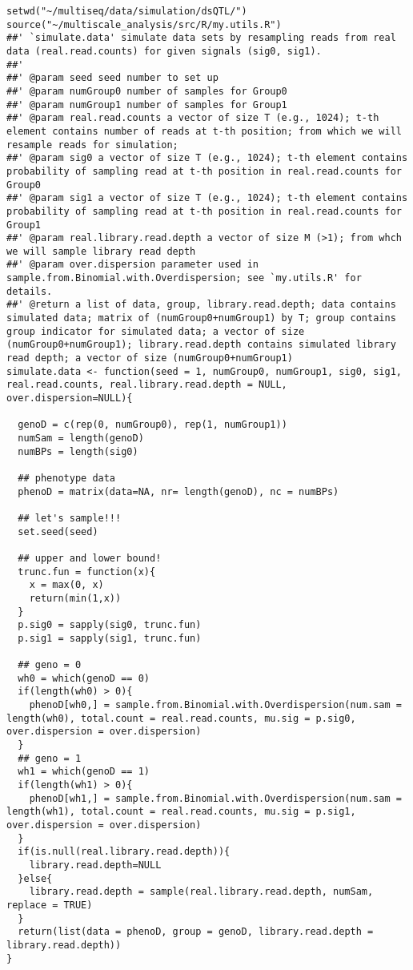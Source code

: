 \documentclass[11pt]{article}
\begin{document}
\begin{lstlisting}
setwd("~/multiseq/data/simulation/dsQTL/")
source("~/multiscale_analysis/src/R/my.utils.R")
##' `simulate.data' simulate data sets by resampling reads from real data (real.read.counts) for given signals (sig0, sig1).
##' 
##' @param seed seed number to set up
##' @param numGroup0 number of samples for Group0
##' @param numGroup1 number of samples for Group1
##' @param real.read.counts a vector of size T (e.g., 1024); t-th element contains number of reads at t-th position; from which we will resample reads for simulation;
##' @param sig0 a vector of size T (e.g., 1024); t-th element contains probability of sampling read at t-th position in real.read.counts for Group0
##' @param sig1 a vector of size T (e.g., 1024); t-th element contains probability of sampling read at t-th position in real.read.counts for Group1
##' @param real.library.read.depth a vector of size M (>1); from whch we will sample library read depth
##' @param over.dispersion parameter used in sample.from.Binomial.with.Overdispersion; see `my.utils.R' for details. 
##' @return a list of data, group, library.read.depth; data contains simulated data; matrix of (numGroup0+numGroup1) by T; group contains group indicator for simulated data; a vector of size (numGroup0+numGroup1); library.read.depth contains simulated library read depth; a vector of size (numGroup0+numGroup1)
simulate.data <- function(seed = 1, numGroup0, numGroup1, sig0, sig1, real.read.counts, real.library.read.depth = NULL, over.dispersion=NULL){

  genoD = c(rep(0, numGroup0), rep(1, numGroup1))
  numSam = length(genoD)
  numBPs = length(sig0)

  ## phenotype data
  phenoD = matrix(data=NA, nr= length(genoD), nc = numBPs)

  ## let's sample!!!
  set.seed(seed)

  ## upper and lower bound!
  trunc.fun = function(x){
    x = max(0, x)
    return(min(1,x))
  }
  p.sig0 = sapply(sig0, trunc.fun)
  p.sig1 = sapply(sig1, trunc.fun)

  ## geno = 0
  wh0 = which(genoD == 0)
  if(length(wh0) > 0){
    phenoD[wh0,] = sample.from.Binomial.with.Overdispersion(num.sam = length(wh0), total.count = real.read.counts, mu.sig = p.sig0, over.dispersion = over.dispersion)
  }  
  ## geno = 1
  wh1 = which(genoD == 1)
  if(length(wh1) > 0){
    phenoD[wh1,] = sample.from.Binomial.with.Overdispersion(num.sam = length(wh1), total.count = real.read.counts, mu.sig = p.sig1, over.dispersion = over.dispersion)
  }
  if(is.null(real.library.read.depth)){
    library.read.depth=NULL
  }else{
    library.read.depth = sample(real.library.read.depth, numSam, replace = TRUE)
  }
  return(list(data = phenoD, group = genoD, library.read.depth = library.read.depth))
}


\end{lstlisting}
\end{document}
